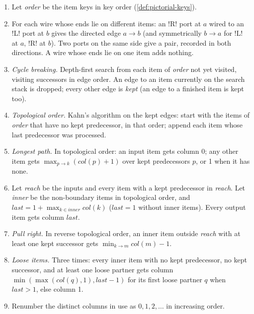 \begin{algorithm}\label{alg:pictorial-layer}
\begin{enumerate}
  \item Let \emph{order} be the item keys in key order (\cref{def:pictorial-keys}).
  \item For each wire whose ends lie on different items: an \code!R! port at $a$ wired to an
    \code!L! port at $b$ gives the directed edge $a\to b$ (and symmetrically $b\to a$ for
    \code!L! at $a$, \code!R! at $b$). Two ports on the same side give a  pair,
    recorded in both directions. A wire whose ends lie on one item adds nothing.
  \item \emph{Cycle breaking.} Depth-first search from each item of \emph{order} not yet
    visited, visiting successors in edge order. An edge to an item currently on the search stack
    is dropped; every other edge is \emph{kept} (an edge to a finished item is kept too).
  \item \emph{Topological order.} Kahn's algorithm on the kept edges: start with the items of
    \emph{order} that have no kept predecessor, in that order; append each item whose last
    predecessor was processed.
  \item \emph{Longest path.} In topological order: an input item gets column 0; any other item
    gets $\max_{p\to k}(\mathit{col}(p)+1)$ over kept predecessors $p$, or 1 when it has none.
  \item Let \emph{reach} be the inputs and every item with a kept predecessor in \emph{reach}.
    Let \emph{inner} be the non-boundary items in topological order, and
    $\mathit{last} = 1 + \max_{k\in\mathit{inner}}\mathit{col}(k)$ ($\mathit{last}=1$ without
    inner items). Every output item gets column $\mathit{last}$.
  \item \emph{Pull right.} In reverse topological order, an inner item outside \emph{reach} with
    at least one kept successor gets $\min_{k\to m}\mathit{col}(m) - 1$.
  \item \emph{Loose items.} Three times: every inner item with no kept predecessor, no kept
    successor, and at least one loose partner gets column
    $\min(\max(\mathit{col}(q), 1), \mathit{last}-1)$ for its first loose partner $q$ when
    $\mathit{last}>1$, else column 1.
  \item Renumber the distinct columns in use as $0, 1, 2, \dots$ in increasing order.
\end{enumerate}
\end{algorithm}

